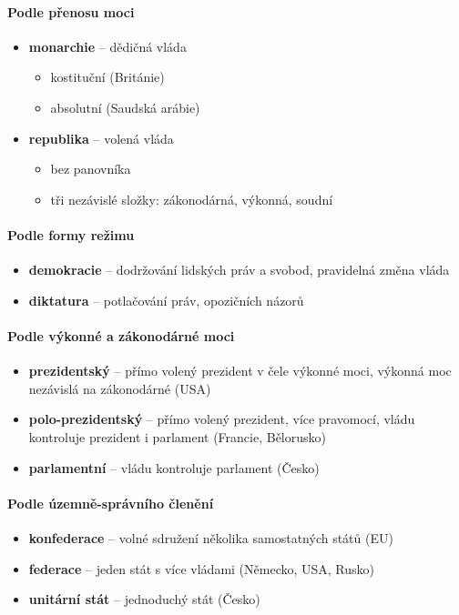 \paragraph{Podle přenosu moci}
\begin{itemize}
\item \textbf{monarchie} -- dědičná vláda
	\begin{itemize}
	\item kostituční (Británie)
	\item absolutní (Saudská arábie)
	\end{itemize}
\item \textbf{republika} -- volená vláda
	\begin{itemize}
	\item bez panovníka
	\item tři nezávislé složky: zákonodárná, výkonná, soudní
	\end{itemize}
\end{itemize}

\paragraph{Podle formy režimu}
\begin{itemize}
\item \textbf{demokracie} -- dodržování lidských práv a svobod, pravidelná změna vláda
\item \textbf{diktatura} -- potlačování práv, opozičních názorů
\end{itemize}

\paragraph{Podle výkonné a zákonodárné moci}
\begin{itemize}
\item \textbf{prezidentský} -- přímo volený prezident v čele výkonné moci, výkonná moc nezávislá na zákonodárné (USA)
\item \textbf{polo-prezidentský} -- přímo volený prezident, více pravomocí, vládu kontroluje prezident i parlament (Francie, Bělorusko)
\item \textbf{parlamentní} -- vládu kontroluje parlament (Česko)
\end{itemize}

\paragraph{Podle územně-správního členění}
\begin{itemize}
\item \textbf{konfederace} -- volné sdružení několika samostatných států (EU)
\item \textbf{federace}  -- jeden stát s více vládami (Německo, USA, Rusko)
\item \textbf{unitární stát} -- jednoduchý stát (Česko)
\end{itemize}

